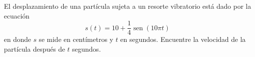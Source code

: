\setcounter{enumi}{66}
\item El desplazamiento de una partícula sujeta a un resorte vibratorio está dado por la ecuación
$$s(t) = 10 + \frac{1}{4} \operatorname{sen}(10\pi t)$$
en donde $s$ se mide en centímetros y $t$ en segundos. Encuentre la velocidad de la partícula después de $t$ segundos.
